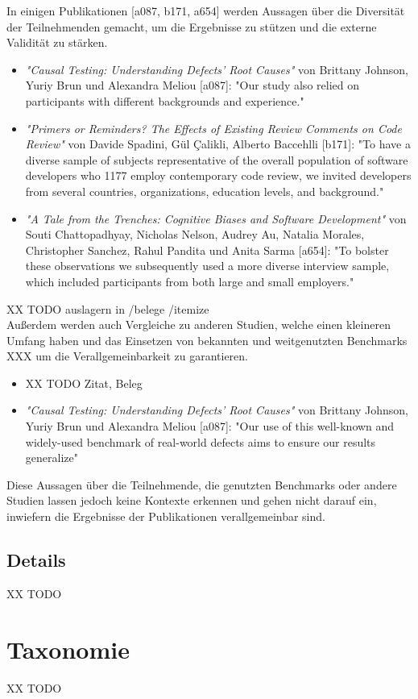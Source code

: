 In einigen Publikationen [a087, b171, a654] werden Aussagen über die Diversität der Teilnehmenden gemacht, um die Ergebnisse zu stützen und die externe Validität zu stärken.
\begin{itemize}
    \item \textit{"Causal Testing: Understanding Defects’ Root Causes"} von Brittany Johnson, Yuriy Brun und Alexandra Meliou [a087]: "Our study also relied on participants with different backgrounds and experience." 
      \item \textit{"Primers or Reminders? The Effects of Existing Review Comments on Code Review"} von Davide Spadini, Gül Çalikli, Alberto Baccehlli [b171]: "To have a diverse sample of subjects representative of the overall population of software developers who 1177 employ contemporary code review, we invited developers from several countries, organizations, education levels, and background."
    \item \textit{"A Tale from the Trenches: Cognitive Biases and Software Development"} von Souti Chattopadhyay, Nicholas Nelson, Audrey Au, Natalia Morales, Christopher Sanchez, Rahul Pandita und Anita Sarma [a654]: "To bolster these observations we subsequently used a more diverse interview sample, which included participants from both large and small employers."
\end{itemize}

XX TODO auslagern in /belege /itemize \\
Außerdem werden auch Vergleiche zu anderen Studien, welche einen kleineren Umfang haben und das Einsetzen von bekannten und weitgenutzten Benchmarks XXX um die Verallgemeinbarkeit zu garantieren. 
\begin{itemize}
    \item XX TODO Zitat, Beleg \\
    \item \textit{"Causal Testing: Understanding Defects’ Root Causes"} von Brittany Johnson, Yuriy Brun und Alexandra Meliou [a087]: "Our use of this well-known and widely-used benchmark of real-world defects aims to ensure our results generalize"
\end{itemize}

Diese Aussagen über die Teilnehmende, die genutzten Benchmarks oder andere Studien lassen jedoch keine Kontexte erkennen und gehen nicht darauf ein, inwiefern die Ergebnisse der Publikationen verallgemeinbar sind. 

\clearpage

\subsection{Details}
XX TODO \\




\section{Taxonomie}
XX TODO \\

